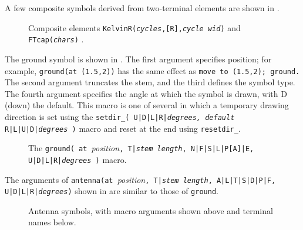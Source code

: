 A few composite symbols derived from two-terminal elements
are shown in .
\begin{figure}[H]
   \vspace*{-0.5ex}
   
   \vspace*{-0.5ex}
   \caption{Composite elements {\tt KelvinR({\sl cycles},[R],{\sl cycle wid})}
      and {\tt FTcap({\sl chars})} .}
   \label{Composite}
   \end{figure}

\enlargethispage{\baselineskip}
The ground symbol is shown in .
The first argument specifies position; for example,
{\tt ground(at (1.5,2))} has the same effect as
{\tt move to (1.5,2); ground.}
The second argument truncates
the stem, and the third defines the symbol type.
The fourth argument specifies the angle at which the symbol is drawn,
with D (down) the default.
This macro is one of several in which a temporary drawing direction
is set using the
 {\tt setdir\_( U|D|L|R|{\sl degrees, default} R|L|U|D|{\sl degrees} )}
macro and reset at the end using {\tt resetdir\_}.
\begin{figure}[H]
   
   \caption{The 
     {\tt ground( at }{\sl position}{\tt,
       T|{\sl stem length}, N|F|S|L|P[A]|E, U|D|L|R|{\sl degrees} )}
     macro.}
   \label{Grounds}
   \end{figure}

The arguments of
{\tt antenna(at }{\sl position}{\tt,
  T|{\sl stem length}, A|L|T|S|D|P|F, U|D|L|R|{\sl degrees})}
shown in  are similar to those of {\tt ground}.
\begin{figure}[H]
   
   \caption{Antenna symbols, with macro arguments shown above and
     terminal names below.}
   \label{Antennas}
   \end{figure}

